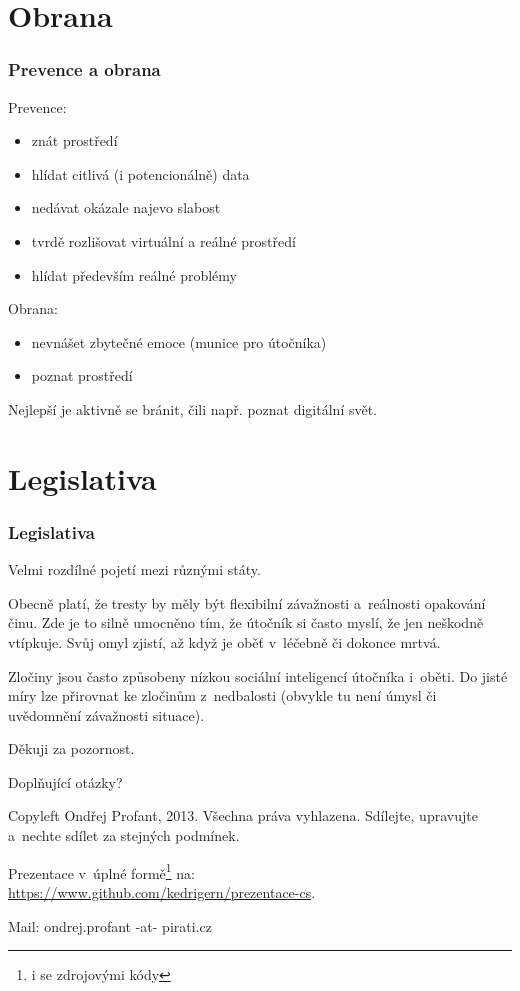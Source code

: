 \documentclass[xetex]{beamer}
\begin{document}
\section{Obrana}
\begin{frame}
	\frametitle{Prevence a obrana}

Prevence:
	\begin{itemize}
		\item znát prostředí
		\item hlídat citlivá (i potencionálně) data
		\item nedávat okázale najevo slabost
		\item tvrdě rozlišovat virtuální a reálné prostředí
		\item hlídat především reálné problémy
	\end{itemize}	

Obrana:
	\begin{itemize}
		\item nevnášet zbytečné emoce (munice pro útočníka)
		\item poznat prostředí
	\end{itemize}

	Nejlepší je aktivně se bránit, čili např. poznat digitální svět.
\end{frame}

\section{Legislativa}
\begin{frame}
	\frametitle{Legislativa}

	Velmi rozdílné pojetí mezi různými státy.

	\bigskip

	Obecně platí, že tresty by měly být flexibilní závažnosti a~reálnosti opakování činu. 
	Zde je to silně umocněno tím, že útočník si často myslí, že jen neškodně vtípkuje. 
	Svůj omyl zjistí, až když je oběť v~léčebně či dokonce mrtvá.

	\bigskip

	Zločiny jsou často způsobeny nízkou sociální inteligencí útočníka i~oběti.
	Do jisté míry lze přirovnat ke zločinům z~nedbalosti 
	(obvykle tu není úmysl či uvědomnění závažnosti situace).
\end{frame}

\begin{frame}

	Děkuji za pozornost.

	\bigskip
	
	Doplňující otázky?

	\bigskip

	\bigskip

	\scriptsize
	Copyleft Ondřej Profant, 2013. Všechna práva vyhlazena. Sdílejte, upravujte a~nechte sdílet za stejných podmínek. 

	\bigskip

	Prezentace v~úplné formě\footnote{i se zdrojovými kódy} na:\\ 
	\url{https://www.github.com/kedrigern/prezentace-cs}.

	\bigskip

	Mail: ondrej.profant -at- pirati.cz 
\end{frame}
\end{document}
